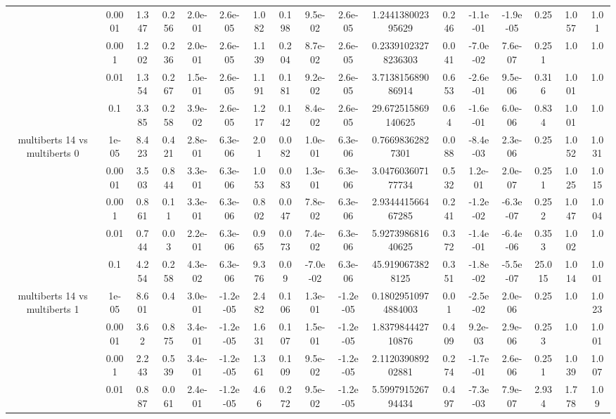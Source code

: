 \begin{tabular}{|c|c|c|c|c|c|c|c|c|c|c|c|c|c|c|c|c|}
 & 0.0001 & 1.347 & 0.256 & 2.0e-01 & 2.6e-05 & 1.082 & 0.198 & 9.5e-02 & 2.6e-05 & 1.244138002395629 & 0.246 & -1.1e-01 & -1.9e-05 & 0.25 & 1.057 & 1.01 \\
 & 0.001 & 1.202 & 0.236 & 2.0e-01 & 2.6e-05 & 1.139 & 0.204 & 8.7e-02 & 2.6e-05 & 0.23391023278236303 & 0.041 & -7.0e-02 & 7.6e-07 & 0.251 & 1.0 & 1.0 \\
 & 0.01 & 1.354 & 0.267 & 1.5e-01 & 2.6e-05 & 1.191 & 0.181 & 9.2e-02 & 2.6e-05 & 3.713815689086914 & 0.653 & -2.6e-01 & 9.5e-06 & 0.316 & 1.001 & 1.0 \\
 & 0.1 & 3.385 & 0.258 & 3.9e-02 & 2.6e-05 & 1.217 & 0.142 & 8.4e-02 & 2.6e-05 & 29.672515869140625 & 0.64 & -1.6e-01 & 6.0e-06 & 0.834 & 1.001 & 1.0 \\
\hline
\multirow{5}{*}{multiberts 14 vs multiberts 0} & 1e-05 & 8.423 & 0.421 & 2.8e-01 & 6.3e-06 & 2.01 & 0.082 & 1.0e-01 & 6.3e-06 & 0.76698362827301 & 0.088 & -8.4e-03 & 2.3e-06 & 0.25 & 1.052 & 1.031 \\
 & 0.0001 & 3.503 & 0.844 & 3.3e-01 & 6.3e-06 & 1.053 & 0.083 & 1.3e-01 & 6.3e-06 & 3.047603607177734 & 0.532 & 1.2e-01 & 2.0e-07 & 0.251 & 1.025 & 1.015 \\
 & 0.001 & 0.861 & 0.11 & 3.3e-01 & 6.3e-06 & 0.802 & 0.047 & 7.8e-02 & 6.3e-06 & 2.934441566467285 & 0.241 & -1.2e-02 & -6.3e-07 & 0.252 & 1.047 & 1.004 \\
 & 0.01 & 0.744 & 0.03 & 2.2e-01 & 6.3e-06 & 0.965 & 0.073 & 7.4e-02 & 6.3e-06 & 5.927398681640625 & 0.372 & -1.4e-01 & -6.4e-06 & 0.353 & 1.002 & 1.0 \\
 & 0.1 & 4.254 & 0.258 & 4.3e-02 & 6.3e-06 & 9.376 & 0.09 & -7.0e-02 & 6.3e-06 & 45.9190673828125 & 0.351 & -1.8e-02 & -5.5e-07 & 25.015 & 1.014 & 1.001 \\
\hline
\multirow{5}{*}{multiberts 14 vs multiberts 1} & 1e-05 & 8.601 & 0.4 & 3.0e-01 & -1.2e-05 & 2.482 & 0.106 & 1.3e-01 & -1.2e-05 & 0.18029510974884003 & 0.01 & -2.5e-02 & 2.0e-06 & 0.25 & 1.0 & 1.023 \\
 & 0.0001 & 3.62 & 0.875 & 3.4e-01 & -1.2e-05 & 1.631 & 0.107 & 1.5e-01 & -1.2e-05 & 1.837984442710876 & 0.409 & 9.2e-03 & 2.9e-06 & 0.253 & 1.0 & 1.001 \\
 & 0.001 & 2.243 & 0.539 & 3.4e-01 & -1.2e-05 & 1.361 & 0.109 & 9.5e-02 & -1.2e-05 & 2.112039089202881 & 0.274 & -1.7e-01 & 2.6e-06 & 0.251 & 1.039 & 1.007 \\
 & 0.01 & 0.887 & 0.061 & 2.4e-01 & -1.2e-05 & 4.66 & 0.272 & 9.5e-02 & -1.2e-05 & 5.599791526794434 & 0.497 & -7.3e-03 & 7.9e-07 & 2.934 & 1.778 & 1.09 \\

\end{tabular}
